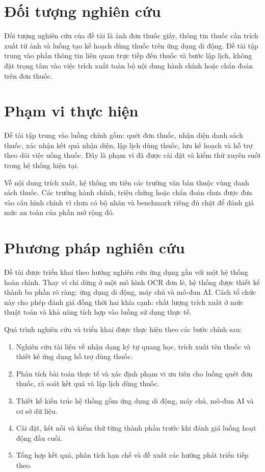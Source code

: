 \documentclass[12pt,a4paper]{report}
\begin{document}
\section{Đối tượng nghiên cứu}

Đối tượng nghiên cứu của đề tài là ảnh đơn thuốc giấy, thông tin thuốc cần trích xuất từ ảnh và luồng tạo kế hoạch dùng thuốc trên ứng dụng di động. Đề tài tập trung vào phần thông tin liên quan trực tiếp đến thuốc và bước lập lịch, không đặt trọng tâm vào việc trích xuất toàn bộ nội dung hành chính hoặc chẩn đoán trên đơn thuốc.

\section{Phạm vi thực hiện}

Đề tài tập trung vào luồng chính gồm: quét đơn thuốc, nhận diện danh sách thuốc, xác nhận kết quả nhận diện, lập lịch dùng thuốc, lưu kế hoạch và hỗ trợ theo dõi việc uống thuốc. Đây là phạm vi đã được cài đặt và kiểm thử xuyên suốt trong hệ thống hiện tại.

Về nội dung trích xuất, hệ thống ưu tiên các trường văn bản thuộc vùng danh sách thuốc. Các trường hành chính, triệu chứng hoặc chẩn đoán chưa được đưa vào cấu hình chính vì chưa có bộ nhãn và benchmark riêng đủ chặt để đánh giá mức an toàn của phần mở rộng đó.

\section{Phương pháp nghiên cứu}

Đề tài được triển khai theo hướng nghiên cứu ứng dụng gắn với một hệ thống hoàn chỉnh. Thay vì chỉ dừng ở một mô hình OCR đơn lẻ, hệ thống được thiết kế thành ba phần rõ ràng: ứng dụng di động, máy chủ và mô-đun AI. Cách tổ chức này cho phép đánh giá đồng thời hai khía cạnh: chất lượng trích xuất ở mức thuật toán và khả năng tích hợp vào luồng sử dụng thực tế.

Quá trình nghiên cứu và triển khai được thực hiện theo các bước chính sau:

\begin{enumerate}[label=\arabic*.]
    \item Nghiên cứu tài liệu về nhận dạng ký tự quang học, trích xuất tên thuốc và thiết kế ứng dụng hỗ trợ dùng thuốc.
    \item Phân tích bài toán thực tế và xác định phạm vi ưu tiên cho luồng quét đơn thuốc, rà soát kết quả và lập lịch dùng thuốc.
    \item Thiết kế kiến trúc hệ thống gồm ứng dụng di động, máy chủ, mô-đun AI và cơ sở dữ liệu.
    \item Cài đặt, kết nối và kiểm thử từng thành phần trước khi đánh giá luồng hoạt động đầu cuối.
    \item Tổng hợp kết quả, phân tích hạn chế và đề xuất các hướng phát triển tiếp theo.
\end{enumerate}
\end{document}
